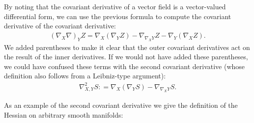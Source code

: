     \begin{result}
        By noting that the covariant derivative of a vector field is a vector-valued differential form, we can use the previous formula to compute the covariant derivative of the covariant derivative:
        \begin{gather}
            (\nabla_X\nabla)_YZ = \nabla_X(\nabla_YZ) - \nabla_{\nabla_XY}Z - \nabla_Y(\nabla_XZ).
        \end{gather}
        We added parentheses to make it clear that the outer covariant derivatives act on the result of the inner derivatives. If we would not have added these parentheses, we could have confused these terms with the second covariant derivative (whose definition also follows from a Leibniz-type argument):
        \begin{gather}
            \nabla^2_{X, Y}S : = \nabla_X(\nabla_YS) - \nabla_{\nabla_XY}S.
        \end{gather}
    \end{result}

    As an example of the second covariant derivative we give the definition of the Hessian on arbitrary smooth manifolds:

